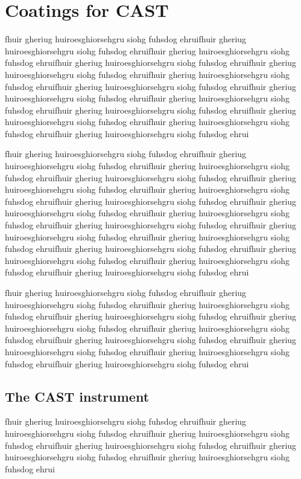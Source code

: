 \chapter{Coatings for CAST}
fhuir gheriug huiroesghiorsehgru siohg fuhsdog ehruifhuir gheriug huiroesghiorsehgru siohg fuhsdog ehruifhuir gheriug huiroesghiorsehgru siohg fuhsdog ehruifhuir gheriug huiroesghiorsehgru siohg fuhsdog ehruifhuir gheriug huiroesghiorsehgru siohg fuhsdog ehruifhuir gheriug huiroesghiorsehgru siohg fuhsdog ehruifhuir gheriug huiroesghiorsehgru siohg fuhsdog ehruifhuir gheriug huiroesghiorsehgru siohg fuhsdog ehruifhuir gheriug huiroesghiorsehgru siohg fuhsdog ehruifhuir gheriug huiroesghiorsehgru siohg fuhsdog ehruifhuir gheriug huiroesghiorsehgru siohg fuhsdog ehruifhuir gheriug huiroesghiorsehgru siohg fuhsdog ehruifhuir gheriug huiroesghiorsehgru siohg fuhsdog ehrui

fhuir gheriug huiroesghiorsehgru siohg fuhsdog ehruifhuir gheriug huiroesghiorsehgru siohg fuhsdog ehruifhuir gheriug huiroesghiorsehgru siohg fuhsdog ehruifhuir gheriug huiroesghiorsehgru siohg fuhsdog ehruifhuir gheriug huiroesghiorsehgru siohg fuhsdog ehruifhuir gheriug huiroesghiorsehgru siohg fuhsdog ehruifhuir gheriug huiroesghiorsehgru siohg fuhsdog ehruifhuir gheriug huiroesghiorsehgru siohg fuhsdog ehruifhuir gheriug huiroesghiorsehgru siohg fuhsdog ehruifhuir gheriug huiroesghiorsehgru siohg fuhsdog ehruifhuir gheriug huiroesghiorsehgru siohg fuhsdog ehruifhuir gheriug huiroesghiorsehgru siohg fuhsdog ehruifhuir gheriug huiroesghiorsehgru siohg fuhsdog ehruifhuir gheriug huiroesghiorsehgru siohg fuhsdog ehruifhuir gheriug huiroesghiorsehgru siohg fuhsdog ehruifhuir gheriug huiroesghiorsehgru siohg fuhsdog ehrui

fhuir gheriug huiroesghiorsehgru siohg fuhsdog ehruifhuir gheriug huiroesghiorsehgru siohg fuhsdog ehruifhuir gheriug huiroesghiorsehgru siohg fuhsdog ehruifhuir gheriug huiroesghiorsehgru siohg fuhsdog ehruifhuir gheriug huiroesghiorsehgru siohg fuhsdog ehruifhuir gheriug huiroesghiorsehgru siohg fuhsdog ehruifhuir gheriug huiroesghiorsehgru siohg fuhsdog ehruifhuir gheriug huiroesghiorsehgru siohg fuhsdog ehruifhuir gheriug huiroesghiorsehgru siohg fuhsdog ehruifhuir gheriug huiroesghiorsehgru siohg fuhsdog ehrui

\section{The CAST instrument}
fhuir gheriug huiroesghiorsehgru siohg fuhsdog ehruifhuir gheriug huiroesghiorsehgru siohg fuhsdog ehruifhuir gheriug huiroesghiorsehgru siohg fuhsdog ehruifhuir gheriug huiroesghiorsehgru siohg fuhsdog ehruifhuir gheriug huiroesghiorsehgru siohg fuhsdog ehruifhuir gheriug huiroesghiorsehgru siohg fuhsdog ehrui


